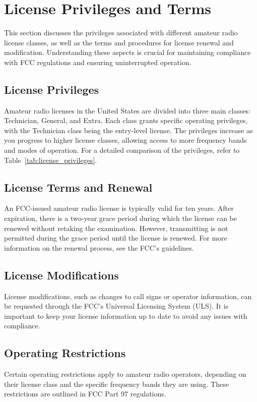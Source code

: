 \section{License Privileges and Terms}
\label{sec:license_privileges}

This section discusses the privileges associated with different amateur radio license classes, as well as the terms and procedures for license renewal and modification. Understanding these aspects is crucial for maintaining compliance with FCC regulations and ensuring uninterrupted operation.

\subsection*{License Privileges}
Amateur radio licenses in the United States are divided into three main classes: Technician, General, and Extra. Each class grants specific operating privileges, with the Technician class being the entry-level license. The privileges increase as you progress to higher license classes, allowing access to more frequency bands and modes of operation. For a detailed comparison of the privileges, refer to Table~\ref{tab:license_privileges}.

\subsection*{License Terms and Renewal}
An FCC-issued amateur radio license is typically valid for ten years. After expiration, there is a two-year grace period during which the license can be renewed without retaking the examination. However, transmitting is not permitted during the grace period until the license is renewed. For more information on the renewal process, see the FCC's guidelines.

\subsection*{License Modifications}
License modifications, such as changes to call signs or operator information, can be requested through the FCC's Universal Licensing System (ULS). It is important to keep your license information up to date to avoid any issues with compliance.

\subsection*{Operating Restrictions}
Certain operating restrictions apply to amateur radio operators, depending on their license class and the specific frequency bands they are using. These restrictions are outlined in FCC Part 97 regulations.

